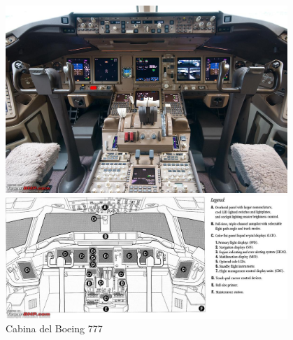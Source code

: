 \begin{figure}[!htb]
  \centering
    \includegraphics[width=0.95\textwidth]{01.tablero.instrumentos/U01.imagenes/1.2.distribucion.normalizada.instrumental.en.tablero/01-boeing777cockpit.jpg}

    \includegraphics[width=0.95\textwidth]{01.tablero.instrumentos/U01.imagenes/1.2.distribucion.normalizada.instrumental.en.tablero/01-boeing777_cockpitlayout.jpg}   
  \caption{Cabina del Boeing 777 \protect\cite{Boeing777_cabina}}
  \label{fig:01.cabina.boeing.777}
\end{figure}




